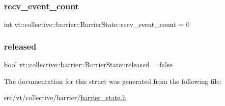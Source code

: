 \subsubsection{\texorpdfstring{recv\+\_\+event\+\_\+count}{recv\_event\_count}}
{\footnotesize\ttfamily int vt\+::collective\+::barrier\+::\+Barrier\+State\+::recv\+\_\+event\+\_\+count = 0}

\mbox{\label{structvt_1_1collective_1_1barrier_1_1_barrier_state_a930afd77ab1b22519988dc108487a6e3}} 
\subsubsection{\texorpdfstring{released}{released}}
{\footnotesize\ttfamily bool vt\+::collective\+::barrier\+::\+Barrier\+State\+::released = false}



The documentation for this struct was generated from the following file\+:\begin{DoxyCompactItemize}
\item 
src/vt/collective/barrier/\hyperlink{barrier__state_8h}{barrier\+\_\+state.\+h}\end{DoxyCompactItemize}
